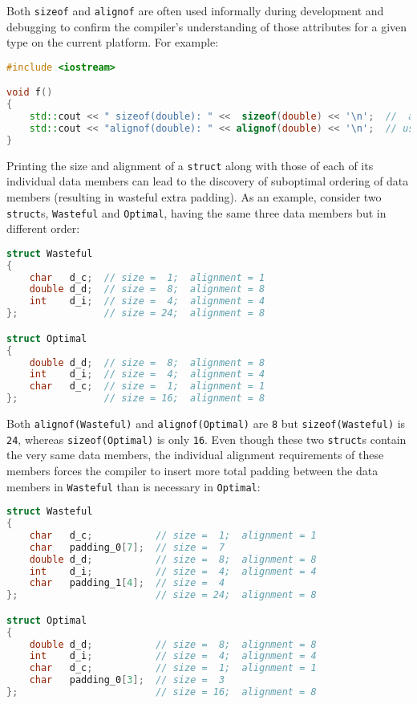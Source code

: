 Both \texttt{sizeof} and \texttt{alignof} are often used informally
during development and debugging to confirm the compiler's understanding
of those attributes for a given type on the current platform. For
example:

\begin{lstlisting}[language=C++]
#include <iostream>

void f()
{
    std::cout << " sizeof(double): " <<  sizeof(double) << '\n';  //  always 8
    std::cout << "alignof(double): " << alignof(double) << '\n';  // usually 8
}
\end{lstlisting}

\noindent Printing the size and alignment of a \texttt{struct} along with those of
each of its individual data members can lead to the discovery of
suboptimal ordering of data members (resulting in wasteful extra
padding). As an example, consider two \texttt{struct}s,
\texttt{Wasteful} and \texttt{Optimal}, having the same three data members but
in different order:

\begin{lstlisting}[language=C++]
struct Wasteful
{
    char   d_c;  // size =  1;  alignment = 1
    double d_d;  // size =  8;  alignment = 8
    int    d_i;  // size =  4;  alignment = 4
};               // size = 24;  alignment = 8

struct Optimal
{
    double d_d;  // size =  8;  alignment = 8
    int    d_i;  // size =  4;  alignment = 4
    char   d_c;  // size =  1;  alignment = 1
};               // size = 16;  alignment = 8
\end{lstlisting}

\noindent Both \texttt{alignof(Wasteful)} and \texttt{alignof(Optimal)} are
\texttt{8} but \texttt{sizeof(Wasteful)} is \texttt{24}, whereas
\texttt{sizeof(Optimal)} is only \texttt{16}. Even though these two
\texttt{struct}s contain the very same data members, the individual
alignment requirements of these members forces the compiler to insert
more total padding between the data members in \texttt{Wasteful} than is
necessary in \texttt{Optimal}:

\begin{lstlisting}[language=C++]
struct Wasteful
{
    char   d_c;           // size =  1;  alignment = 1
    char   padding_0[7];  // size =  7
    double d_d;           // size =  8;  alignment = 8
    int    d_i;           // size =  4;  alignment = 4
    char   padding_1[4];  // size =  4
};                        // size = 24;  alignment = 8

struct Optimal
{
    double d_d;           // size =  8;  alignment = 8
    int    d_i;           // size =  4;  alignment = 4
    char   d_c;           // size =  1;  alignment = 1
    char   padding_0[3];  // size =  3
};                        // size = 16;  alignment = 8
\end{lstlisting}


